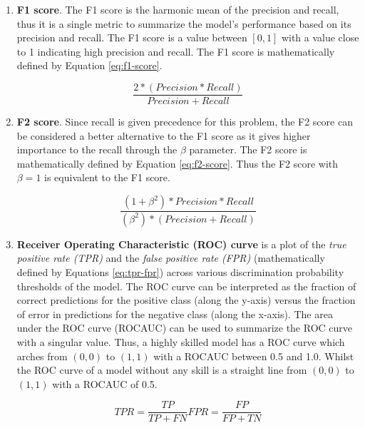 \begin{enumerate}
\item \textbf{F1 score}. The F1 score is the harmonic mean of the
  precision and recall, thus it is a single metric to summarize the
  model's performance based on its precision and recall. The F1 score
  is a value between $[0, 1]$ with a value close to 1 indicating high
  precision and recall. The F1 score is mathematically defined by
  Equation \ref{eq:f1-score}.

  \begin{equation}
    \frac{2 * (Precision * Recall)}{Precision + Recall}
    \label{eq:f1-score}
  \end{equation}
  
\item \textbf{F2 score}. Since recall is given precedence for this
  problem, the F2 score can be considered a better alternative to the
  F1 score as it gives higher importance to the recall through the
  $\beta$ parameter. The F2 score is mathematically defined by
  Equation \ref{eq:f2-score}. Thus the F2 score with $\beta = 1$ is
  equivalent to the F1 score.

  \begin{equation}
    \frac{(1 + \beta^{2}) * Precision * Recall}{(\beta^{2}) *
      (Precision + Recall)}
    \label{eq:f2-score}
  \end{equation}
  
\item \textbf{Receiver Operating Characteristic (ROC) curve} is a plot
  of the \emph{true positive rate (TPR)} and the \emph{false positive
  rate (FPR)} (mathematically defined by Equations \ref{eq:tpr-fpr})
  across various discrimination probability thresholds of the model.
  The ROC curve can be interpreted as the fraction of correct
  predictions for the positive class (along the y-axis) versus the
  fraction of error in predictions for the negative class (along the
  x-axis). The area under the ROC curve (ROCAUC) can be used to
  summarize the ROC curve with a singular value. Thus, a highly
  skilled model has a ROC curve which arches from $(0,0)$ to $(1,1)$
  with a ROCAUC  between 0.5 and 1.0. Whilst the ROC curve of a model
  without any skill is a straight line from $(0,0)$ to $(1,1)$ with a
  ROCAUC of 0.5.


  \begin{equation}
    TPR = \frac{TP}{TP + FN}
    FPR = \frac{FP}{FP + TN}
    \label{eq:tpr-fpr}
  \end{equation}
  

\end{enumerate}
